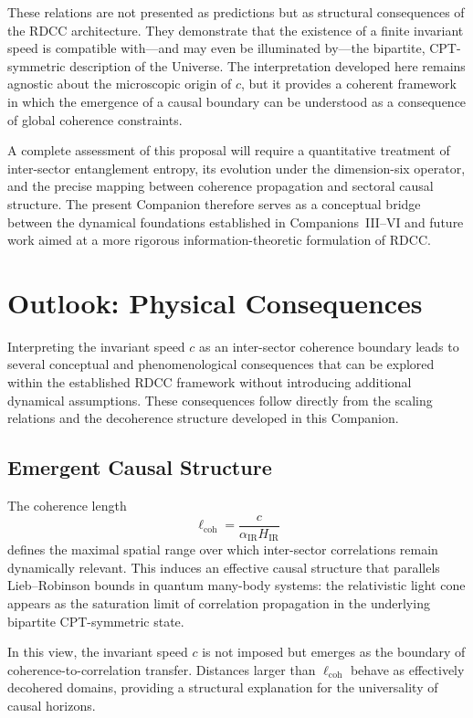\documentclass[11pt,a4paper]{article}
\begin{document}
These relations are not presented as predictions but as structural consequences of the RDCC
architecture. They demonstrate that the existence of a finite invariant speed is compatible
with—and may even be illuminated by—the bipartite, CPT-symmetric description of the
Universe. The interpretation developed here remains agnostic about the microscopic origin of
$c$, but it provides a coherent framework in which the emergence of a causal boundary can be
understood as a consequence of global coherence constraints.

A complete assessment of this proposal will require a quantitative treatment of inter-sector
entanglement entropy, its evolution under the dimension-six operator, and the precise mapping
between coherence propagation and sectoral causal structure. The present Companion therefore
serves as a conceptual bridge between the dynamical foundations established in Companions~III–VI
and future work aimed at a more rigorous information-theoretic formulation of RDCC.

\section{Outlook: Physical Consequences}

Interpreting the invariant speed $c$ as an inter-sector coherence boundary leads to several
conceptual and phenomenological consequences that can be explored within the established
RDCC framework without introducing additional dynamical assumptions. These consequences
follow directly from the scaling relations and the decoherence structure developed in this
Companion.

\subsection{Emergent Causal Structure}

The coherence length
\begin{equation}
    \ell_{\mathrm{coh}} = \frac{c}{\alpha_{\mathrm{IR}} H_{\mathrm{IR}}}
\end{equation}
defines the maximal spatial range over which inter-sector correlations remain dynamically
relevant. This induces an effective causal structure that parallels Lieb–Robinson bounds in
quantum many-body systems: the relativistic light cone appears as the saturation limit of
correlation propagation in the underlying bipartite CPT-symmetric state.

In this view, the invariant speed $c$ is not imposed but emerges as the boundary of
coherence-to-correlation transfer. Distances larger than $\ell_{\mathrm{coh}}$ behave as effectively
decohered domains, providing a structural explanation for the universality of causal horizons.
\end{document}
